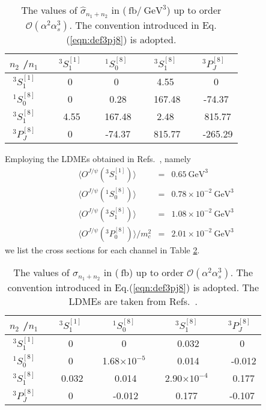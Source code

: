 \documentclass[preprint,showpacs,preprintnumbers,amssymb,aps]{revtex4}
\def\bea{\begin{eqnarray}}
\def\eea{\end{eqnarray}}
\def\NO{\nonumber}
\def\gev{\mathrm{~GeV}}
\def\fb{\mathrm{~fb}}
\begin{document}
\begin{table}[htbp]
\begin{center}
\caption{
The values of $\hat{\sigma}_{n_1+n_2}$ in ($\fb/\gev^3$) up to order $\mathcal{O}(\alpha^2\alpha_s^3)$.
The convention introduced in Eq.(\ref{eqn:def3pj8}) is adopted.
}
\begin{tabular}{ccccc}
\hline
\hline
$n_2$ \slash $n_1$~&~$^3S_1^{[1]}$~&~$^1S_0^{[8]}$~&~$^3S_1^{[8]}$~&~$^3P_J^{[8]}$~ \\
\hline
$^3S_1^{[1]}$~&~0~&~0~&~4.55~&~0 \\
\hline
$^1S_0^{[8]}$~&~0~&~ 0.28~&~ 167.48~&~-74.37 \\
\hline
$^3S_1^{[8]}$~&~ 4.55~&~ 167.48~&~ 2.48 ~&~ 815.77 \\
\hline
$^3P_J^{[8]}$~&~0~&~ -74.37~&~ 815.77~&~ -265.29 \\
\hline
\hline
\end{tabular}
\label{tab:sdc}
\end{center}
\end{table}

Employing the LDMEs obtained in Refs.~\cite{Zhang:2014ybe, Sun:2015pia},
namely
\bea
\langle O^{J/\psi}(^3S_1^{[1]})\rangle&=&0.65 \gev^3 \NO \\
\langle O^{J/\psi}(^1S_0^{[8]})\rangle&=&0.78\times 10^{-2} \gev^3 \NO \\
\langle O^{J/\psi}(^3S_1^{[8]})\rangle&=&1.08\times 10^{-2} \gev^3 \NO \\
\langle O^{J/\psi}(^3P_0^{[8]})\rangle /m_c^2 &=&2.01\times 10^{-2} \gev^3 \label{eqn:ldmevalue}
\eea
we list the cross sections for each channel in Table \ref{tab:cs}.

\begin{table}[htbp]
\begin{center}
\caption{
The values of $\sigma_{n_1+n_2}$ in ($\fb$) up to order $\mathcal{O}(\alpha^2\alpha_s^3)$.
The convention introduced in Eq.(\ref{eqn:def3pj8}) is adopted.
The LDMEs are taken from Refs.~\cite{Zhang:2014ybe, Sun:2015pia}.
}
\begin{tabular}{ccccc}
\hline
\hline
$n_2$ \slash $n_1$~&~$^3S_1^{[1]}$~&~$^1S_0^{[8]}$~&~$^3S_1^{[8]}$~&~$^3P_J^{[8]}$~ \\
\hline
$^3S_1^{[1]}$~&~0~&~0~&~ 0.032~&~0 \\
\hline
$^1S_0^{[8]}$~&~0~&~1.68$\times10^{-5}$~&~ 0.014~&~ -0.012 \\
\hline
$^3S_1^{[8]}$~&~ 0.032~&~ 0.014~&~2.90$\times10^{-4}$~&~ 0.177 \\
\hline
$^3P_J^{[8]}$~&~0~&~ -0.012~&~0.177~&~-0.107 \\
\hline
\hline
\end{tabular}
\label{tab:cs}
\end{center}
\end{table}
\end{document}
